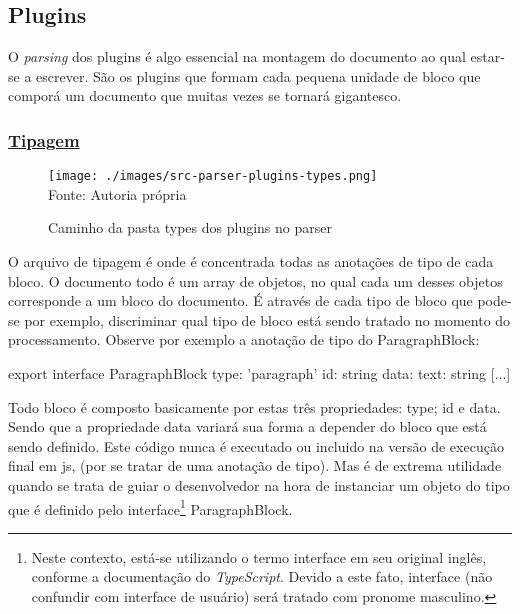 \subsection{Plugins}

O \textit{parsing} dos plugins é algo essencial na montagem
do documento ao qual estar-se a escrever. São os plugins
que formam cada pequena unidade de bloco que comporá
um documento que muitas vezes se tornará gigantesco.

\subsubsection{\underline{Tipagem}}

\begin{figure}[H]
    \centering
    \caption{Caminho da pasta types dos plugins no parser}
    \texttt{[image: ./images/src-parser-plugins-types.png]}
    \label{fig:src-parser-plugins-types} \\
    \textnormal{\fontsize{10pt}{12pt}Fonte: Autoria própria}
\end{figure}

O arquivo de tipagem é onde é concentrada todas as anotações
de tipo de cada bloco. O documento todo é um array de objetos,
no qual cada um desses objetos corresponde a um bloco
do documento. É através de cada tipo de bloco que pode-se por exemplo,
discriminar qual tipo de bloco está sendo tratado no momento do processamento.
Observe por exemplo a anotação de tipo do ParagraphBlock:

\begin{ParagraphBlockCode}
[...]
export interface ParagraphBlock {
    type: 'paragraph'
    id: string
    data: {
        text: string
    }
}
[...]
\end{ParagraphBlockCode}

Todo bloco é composto basicamente por estas três propriedades:
type; id e data. Sendo que a propriedade data variará sua
forma a depender do bloco que está sendo definido. Este código
nunca é executado ou incluido na versão de execução final em
\acrshort{js},
(por se tratar de uma anotação de tipo). Mas é de extrema
utilidade quando se trata de guiar o desenvolvedor na hora
de instanciar um objeto do tipo que é definido pelo
interface\footnote{Neste contexto, está-se utilizando o termo interface em seu original
    inglês, conforme a documentação do \textit{TypeScript}. Devido a este fato,
    interface (não confundir com interface de usuário) será tratado
    com pronome masculino.
}
ParagraphBlock.


